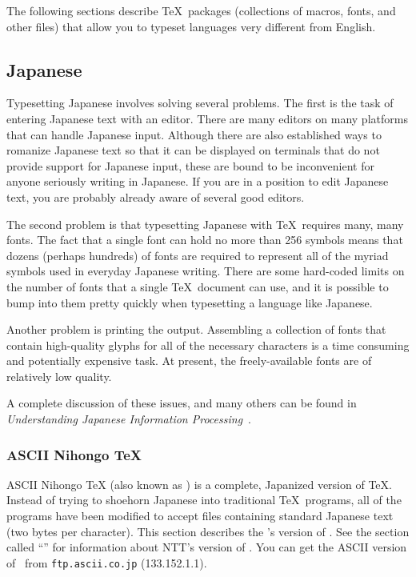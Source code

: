 The following sections describe \TeX\ packages (collections of macros,
fonts, and other files) that allow you to typeset languages very
different from English.  

\subsection{Japanese}

Typesetting Japanese 
involves solving several problems.  The first is
the task of entering Japanese text with an editor.  There are many editors on
many platforms that can handle Japanese input.  Although there are also
established ways to romanize Japanese text so that it can be displayed on
terminals that do not provide support for Japanese input, these are bound to
be inconvenient for anyone seriously writing in Japanese.  If you are in a
position to edit Japanese text, you are probably already aware of several 
good editors.

The second problem is that typesetting Japanese with \TeX\ requires many,
many fonts.  The fact that a single font can hold no more than 256 symbols
means that dozens (perhaps hundreds) of fonts are required to represent
all of the myriad symbols used in everyday Japanese writing.  There are
some hard-coded limits on the number of fonts that a single \TeX\
document can use, and it is possible to bump into them pretty quickly
when typesetting a language like Japanese.

Another problem is printing the output.  Assembling a collection of fonts
that contain high-quality glyphs for all of the necessary characters is a
time consuming and potentially expensive task.  At present, the 
freely-available fonts are of relatively low quality.

A complete discussion of these issues, and many others can be found in
\textit{Understanding Japanese Information Processing}~\cite{kl:japinfoproc}.

\subsubsection{ASCII Nihongo \protect\TeX}
\label{sec:asciijtex}

ASCII Nihongo \TeX{} (also 
known as \ixx{\jtex}{jtex@\jtex}) is a complete, Japanized version of
\TeX.  Instead of trying to shoehorn Japanese into traditional \TeX\ programs,
all of the programs have been modified to accept files containing standard
Japanese text (two bytes per character).  This section describes the 
\idx{ASCII Corporation}'s version of \jtex.  See the section called
``\nameref{sec:nttjtex}'' for information about NTT's version of \jtex.  You
can get the ASCII version of \jtex\ from \verb|ftp.ascii.co.jp| (133.152.1.1).

